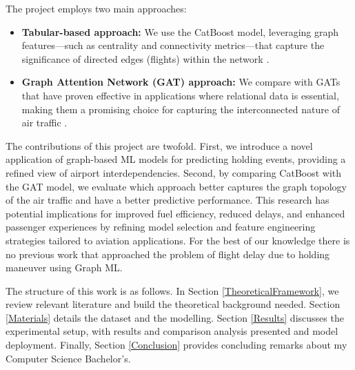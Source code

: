 The project employs two main approaches:

\begin{itemize}
    \item \textbf{Tabular-based approach:} We use the CatBoost model, leveraging graph features—such as centrality and connectivity metrics—that capture the significance of directed edges (flights) within the network \cite{prokhorenkova2018catboost}.
    \item \textbf{Graph Attention Network (GAT) approach:} We compare with GATs that have proven effective in applications where relational data is essential, making them a promising choice for capturing the interconnected nature of air traffic \cite{velickovic2017graph}.
\end{itemize}

The contributions of this project are twofold. First, we introduce a novel application of graph-based ML models for predicting holding events, providing a refined view of airport interdependencies. Second, by comparing CatBoost with the GAT model, we evaluate which approach better captures the graph topology of the air traffic and have a better predictive performance. This research has potential implications for improved fuel efficiency, reduced delays, and enhanced passenger experiences by refining model selection and feature engineering strategies tailored to aviation applications. For the best of our knowledge there is no previous work that approached the problem of flight delay due to holding maneuver using Graph ML.

The structure of this work is as follows. In Section \ref{TheoreticalFramework}, we review relevant literature and build the theoretical background needed. Section \ref{Materials} details the dataset and the modelling. Section \ref{Results} discusses the experimental setup, with results and comparison analysis presented and model deployment. Finally, Section \ref{Conclusion} provides concluding remarks about my Computer Science Bachelor's.
